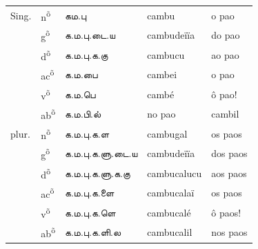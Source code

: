\documentclass[12pt,a4paper]{scrbook}
\begin{document}
      
\begin{tabular}{lllll}
    
        
          Sing. &
          n\textsuperscript{õ} &
          கம.பு &
          cambu &
          o pao \\
    
        
    
        
           &
          g\textsuperscript{õ} &
           க.ம.பு.டை.ய &
          cambudeïïa &
          do pao \\
    
        
    
        
           &
          d\textsuperscript{õ} &
          க.ம.பு.க.கு &
          cambucu &
          ao pao \\
    
        
    
        
           &
          ac\textsuperscript{õ} &
          க.ம.பை &
          cambei &
          o pao \\
    
        
    
        
           &
          v\textsuperscript{õ} &
          க.ம.பெ &
          cambé &
          ô pao! \\
    
        
    
        
           &
          ab\textsuperscript{õ} &
          க.ம.பி.ல் &
          no pao &
          cambil \\
    
        
    
        
          plur. &
          n\textsuperscript{õ} &
          க.ம.பு.க.ள &
          cambugal &
          os paos \\
    
        
    
        
           &
          g\textsuperscript{õ} &
          க.ம.பு.க.ளு.டை.ய &
          cambudeïïa &
          dos paos \\
    
        
    
        
           &
          d\textsuperscript{õ} &
          க.ம.பு.க.ளு.க.கு &
          cambucalucu &
          aos paos \\
    
        
    
        
           &
          ac\textsuperscript{õ} &
          க.ம.பு.க.ளை &
          cambucalaï &
          os paos \\
    
        
    
        
           &
          v\textsuperscript{õ} &
          க.ம.பு.க.ளெ &
           cambucalé &
          ô paos! \\
    
        
    
        
           &
          ab\textsuperscript{õ} &
          க.ம.பு.க.ளி.ல &
          cambucalil &
          nos paos \\
    
        
    
      
\end{tabular}
    
\end{document}
